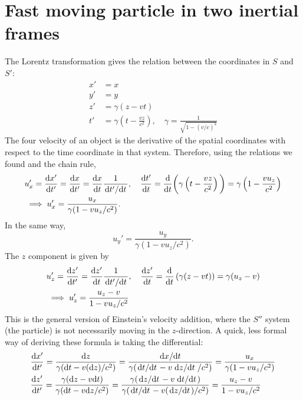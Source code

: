 \documentclass{article}
\begin{document}
    \section{Fast moving particle in two inertial frames}
        The Lorentz transformation gives the relation between the coordinates in $S$ and $S'$:
        \begin{align*}
            x' & = x \\
            y' & = y \\
            z' & = \gamma (z - vt) \\
            t' & = \gamma \left(t - \frac{v z}{c^2}\right), \quad \gamma = \frac{1}{\sqrt{1 - (v/c)^2}}
        \end{align*}
        The four velocity of an object is the derivative of the spatial coordinates with respect to the time coordinate in that system. Therefore, using the relations we found and the chain rule, 
        \begin{align*}
            &u_x' = \dv{x'}{t'} = \dv{x}{t'} = \dv{x}{t} \frac{1}{\dv*{t'}{t}}, \quad
            \dv{t'}{t} = \dv{t} \bigg( \gamma \left(t - \frac{v z}{c^2}\right)\bigg) = \gamma \left(1 - \frac{v u_z}{c^2}\right) \\
            &\implies u_x' = \frac{u_x}{\gamma (1 - v u_z/c^2)}.
        \end{align*}
        In the same way,
        \begin{equation*}
            u_y' = \frac{u_y}{\gamma (1 - v u_z/c^2)}.
        \end{equation*}
        The $z$ component is given by
        \begin{align*}
            &u_z' = \dv{z'}{t'} = \dv{z'}{t} \frac{1}{\dv*{t'}{t}}, \quad \dv{z'}{t} = \dv{t} \left(\gamma (z - vt) \right) = \gamma (u_z - v) \\
            & \implies u_z' = \frac{u_z - v}{1 - v u_z /c^2}
        \end{align*}
        This is the general version of Einstein's velocity addition, where the $S''$ system (the particle) is not necessarily moving in the $z$-direction. A quick, less formal way of deriving these formula is taking the differential:
        \begin{align*}
            & \dv{x'}{t'} = \frac{\dd z}{\gamma(\dd t - v (\dd z)/c^2)} = \frac{\dv*{x}{t}}{\gamma (\dv*{t}{t} - v \dv*{z}{t}/c^2)} = \frac{u_x}{\gamma (1 - v u_z/c^2)} \\
            & \dv{z'}{t'} = \frac{\gamma(\dd z - v \dd t)}{\gamma (\dd t - v \dd z/c^2)} = \frac{\gamma(\dv*{z}{t} - v \dv*{t}{t})}{\gamma (\dv*{t}{t} - v (\dv*{z}{t})/c^2)} = \frac{u_z - v}{1 - v u_z /c^2}
        \end{align*}
\end{document}
